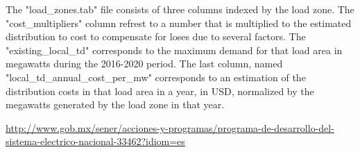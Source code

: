 \documentclass{article}
\begin{document}
The "load\_zones.tab" file consists of three columns indexed by the load zone. The "cost\_multipliers" column refrest to a number that is multiplied to the estimated distribution to cost to compensate for loses due to several factors. The "existing\_local\_td" corresponds to the maximum demand for that load area in megawatts during the 2016-2020 period. The last column, named "local\_td\_annual\_cost\_per\_mw" corresponds to an estimation of the distribution costs in that load area in a year, in USD, normalized by the megawatts generated by the load zone in that year.

\begin{thebibliography}{9}
 \url{http://www.gob.mx/sener/acciones-y-programas/programa-de-desarrollo-del-sistema-electrico-nacional-33462?idiom=es}
\end{thebibliography}
\end{document}
